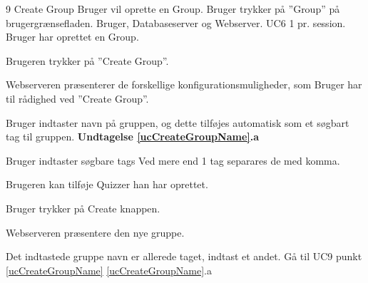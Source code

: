 
\uchead
	{9}
	{Create Group}
	{Bruger vil oprette en Group.}
	{Bruger trykker på ''Group'' på brugergrænsefladen.}
	{Bruger, Databaseserver og Webserver.}
	{UC6}
	{1 pr. session.}
	{Bruger har oprettet en Group.}
\item Brugeren trykker på ''Create Group''.

\item Webserveren præsenterer de forskellige konfigurationsmuligheder, som Bruger har til rådighed ved ''Create Group''.

\item \label{ucCreateGroupName} Bruger indtaster navn på gruppen, og dette tilføjes automatisk som et søgbart tag til gruppen. \textbf{Undtagelse \ref{ucCreateGroupName}.a}

\item Bruger indtaster søgbare tags Ved mere end 1 tag separares de med komma.
\item Brugeren kan tilføje Quizzer han har oprettet.

\item Bruger trykker på Create knappen.

\item Webserveren præsentere den nye gruppe.

\ucdescriptionend

\ucextension
	{Det indtastede gruppe navn er allerede taget, indtast et andet.}
	{Gå til UC9 punkt \ref{ucCreateGroupName}}
	{\ref{ucCreateGroupName}.a}
		
